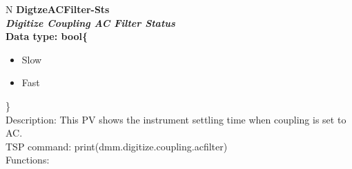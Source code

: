 \documentclass[openany]{article}
\begin{document}
		\begin{tabular}{N}
			\hline
			\bfseries DigtzeACFilter-Sts\label{pv:digtzeacfilter-sts} \\ \hline
			\emph{Digitize Coupling AC Filter Status} \\
			Data type: bool\{\begin{itemize}[noitemsep]
				\small
				\item[] Slow
				\item[] Fast
			\end{itemize}\} \\
			Description: This PV shows the instrument settling time when coupling is set to AC. \\
			TSP command: print(dmm.digitize.coupling.acfilter) \\
			Functions: \\
			\arrayrulecolor{\FuncTableBorderColor}

		\end{tabular}
\end{document}
